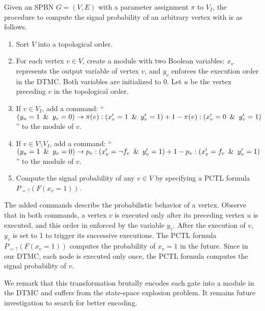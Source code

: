 Given an SPBN $G=(V,E)$ with a parameter assignment $\pi$ to $V_I$,
the procedure to compute the signal probability of an arbitrary vertex with \prism is as follows.
\begin{enumerate}
    \item Sort $V$ into a topological order.
    \item For each vertex $v\in V$, create a module with two Boolean variables:
          $x_v$ represents the output variable of vertex $v$,
          and $y_v$ enforces the execution order in the DTMC.
          Both variables are initialized to $0$.
          Let $u$ be the vertex preceding $v$ in the topological order.
    \item If $v\in V_I$, add a command:
          ``$(y_u=1 \enskip\&\enskip y_v=0) \rightarrow
              \pi(v):(x_v'=1 \enskip\&\enskip y_v'=1)+
              1-\pi(v):(x_v'=0 \enskip\&\enskip y_v'=1)$''
          to the module of $v$.
    \item If $v\in V\setminus V_I$, add a command:
          ``$(y_u=1 \enskip\&\enskip y_v=0) \rightarrow
              p_v:(x_v'=\neg f_v \enskip\&\enskip y_v'=1)+
              1-p_v:(x_v'=f_v \enskip\&\enskip y_v'=1)$''
          to the module of $v$.
    \item Compute the signal probability of any $v\in V$ by specifying a PCTL formula $P_{=?}(F(x_v=1))$.
\end{enumerate}

The added commands describe the probabilistic behavior of a vertex.
Observe that in both commands,
a vertex $v$ is executed only after its preceding vertex $u$ is executed,
and this order in enforced by the variable $y_v$.
After the execution of $v$,
$y_v$ is set to 1 to trigger its successive executions.
The PCTL formula $P_{=?}(F(x_v=1))$ computes the probability of $x_v=1$ in the future.
Since in our DTMC, each node is executed only once,
the PCTL formula computes the signal probability of $v$.

We remark that this transformation brutally encodes each gate into a module in the DTMC and suffers from the state-space explosion problem.
It remains future investigation to search for better encoding.